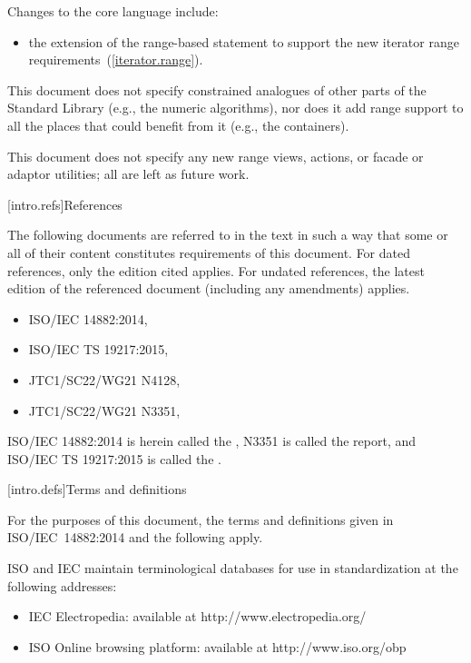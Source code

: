 \pnum
Changes to the core language include:

\begin{itemize}
\item the extension of the range-based  statement to support
the new iterator range requirements~(\ref{iterator.range}).
\end{itemize}

\pnum
This document does not specify constrained analogues of other parts of the Standard
Library (e.g., the numeric algorithms), nor does it add range support to all the
places that could benefit from it (e.g., the containers).

\pnum
This document does not specify any new range views, actions, or facade or adaptor
utilities; all are left as future work.

[intro.refs]{References}

\pnum
The following documents are referred to in the text in such a way that some or
all of their content constitutes requirements of this document. For dated
references, only the edition cited applies. For undated references, the latest
edition of the referenced document (including any amendments) applies.

\begin{itemize}
\item ISO/IEC 14882:2014, 
\item ISO/IEC TS 19217:2015, 
\item JTC1/SC22/WG21 N4128, 
\item JTC1/SC22/WG21 N3351, 
\end{itemize}

ISO/IEC 14882:2014 is herein called the , N3351 is called the
 report, and ISO/IEC TS 19217:2015 is called the .

[intro.defs]{Terms and definitions}

For the purposes of this document, the terms and definitions given in
ISO/IEC~14882:2014 and the following apply.

ISO and IEC maintain terminological databases for use in standardization at
the following addresses:
\begin{itemize}
\item
IEC Electropedia: available at http://www.electropedia.org/
\item
ISO Online browsing platform: available at http://www.iso.org/obp
\end{itemize}

